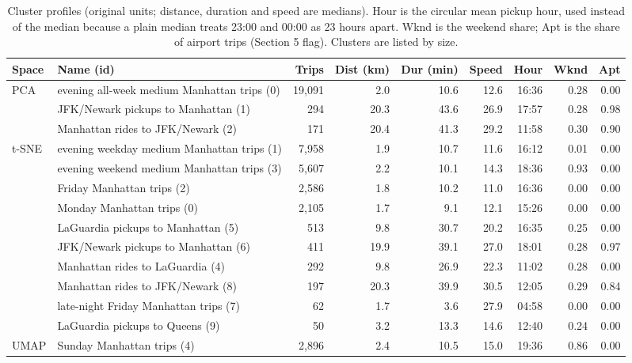 \documentclass{article}
\begin{document}
\begin{table}[!htbp]
  \caption{Cluster profiles (original units; distance, duration and speed are medians). Hour is the circular mean pickup hour, used instead of the median because a plain median treats 23:00 and 00:00 as 23 hours apart. Wknd is the weekend share; Apt is the share of airport trips (Section 5 flag). Clusters are listed by size.}
  \label{tab:q6_profiles}
  \centering
  \scriptsize
  \setlength{\tabcolsep}{3.5pt}
  \begin{tabular}{llrrrrrrr}
    \toprule
    Space & Name (id) & Trips & Dist (km) & Dur (min) & Speed & Hour & Wknd & Apt \\
    \midrule
    PCA & evening all-week medium Manhattan trips (0) & 19,091 & 2.0 & 10.6 & 12.6 & 16:36 & 0.28 & 0.00 \\
     & JFK/Newark pickups to Manhattan (1) & 294 & 20.3 & 43.6 & 26.9 & 17:57 & 0.28 & 0.98 \\
     & Manhattan rides to JFK/Newark (2) & 171 & 20.4 & 41.3 & 29.2 & 11:58 & 0.30 & 0.90 \\
    \midrule
    t-SNE & evening weekday medium Manhattan trips (1) & 7,958 & 1.9 & 10.7 & 11.6 & 16:12 & 0.01 & 0.00 \\
     & evening weekend medium Manhattan trips (3) & 5,607 & 2.2 & 10.1 & 14.3 & 18:36 & 0.93 & 0.00 \\
     & Friday Manhattan trips (2) & 2,586 & 1.8 & 10.2 & 11.0 & 16:36 & 0.00 & 0.00 \\
     & Monday Manhattan trips (0) & 2,105 & 1.7 & 9.1 & 12.1 & 15:26 & 0.00 & 0.00 \\
     & LaGuardia pickups to Manhattan (5) & 513 & 9.8 & 30.7 & 20.2 & 16:35 & 0.25 & 0.00 \\
     & JFK/Newark pickups to Manhattan (6) & 411 & 19.9 & 39.1 & 27.0 & 18:01 & 0.28 & 0.97 \\
     & Manhattan rides to LaGuardia (4) & 292 & 9.8 & 26.9 & 22.3 & 11:02 & 0.28 & 0.00 \\
     & Manhattan rides to JFK/Newark (8) & 197 & 20.3 & 39.9 & 30.5 & 12:05 & 0.29 & 0.84 \\
     & late-night Friday Manhattan trips (7) & 62 & 1.7 & 3.6 & 27.9 & 04:58 & 0.00 & 0.00 \\
     & LaGuardia pickups to Queens (9) & 50 & 3.2 & 13.3 & 14.6 & 12:40 & 0.24 & 0.00 \\
    \midrule
    UMAP & Sunday Manhattan trips (4) & 2,896 & 2.4 & 10.5 & 15.0 & 19:36 & 0.86 & 0.00 \\

\end{tabular}
\end{table}
\end{document}
